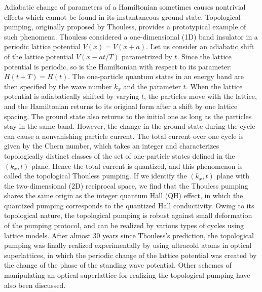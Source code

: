 \documentclass[aps,prb,twocolumn,superscriptaddress,showpacs,floatfix]{revtex4-1}
\begin{document}
Adiabatic change of parameters of a Hamiltonian sometimes causes nontrivial effects which cannot be found in its instantaneous ground state. Topological pumping, originally proposed by Thouless,\cite{Thouless} provides a prototypical example of such phenomena. Thouless considered a one-dimensional (1D) band insulator in a periodic lattice potential $V(x)=V(x+a)$. Let us consider an adiabatic shift of the lattice potential $V(x-at/T)$ parametrized by $t$. Since the lattice potential is periodic, so is the Hamiltonian with respect to its parameter: $H(t+T)=H(t)$. The one-particle quantum states in an energy band are then specified by the wave number $k_x$ and the parameter $t$. When the lattice potential is adiabatically shifted by varying $t$, 
the particles move with the lattice, and the Hamiltonian returns to its original form after a shift by one lattice spacing. The ground state also returns to the initial one as long as the particles stay in the same band. 
However, the change in the ground state during the cycle can cause a nonvanishing particle current. The total current over
one cycle is given by the Chern number, which takes an integer and characterizes topologically distinct classes of the set of one-particle states defined in the $(k_x, t)$ plane. Hence the total current is quantized, and this phenomenon is called the topological Thouless pumping. If we identify the $(k_x,t)$ plane with the two-dimensional (2D) reciprocal space, we find that the Thouless pumping shares the same origin as the integer quantum Hall (QH) effect,\cite{TKNN,Kohmoto} in which the quantized pumping corresponds to the quantized Hall conductivity.
Owing to its topological nature, the topological pumping is robust against small deformation of the pumping protocol, and can be 
realized by various types of cycles using lattice models.\cite{RiceMele, NiuReview, Shindou, BergLevinAltman} After almost 30 years since Thouless's prediction, the topological pumping was finally realized experimentally by using ultracold atoms in optical superlattices,\cite{Nakajima, Lohse, Schweizer} in which the periodic change of the lattice potential was created by the change of the phase of the standing wave potential. 
Other schemes of manipulating an optical superlattice for realizing the topological pumping have also been discussed.\cite{ChiangNiu, WangTroyerDai, Marra, WeiMueller} 
\end{document}
